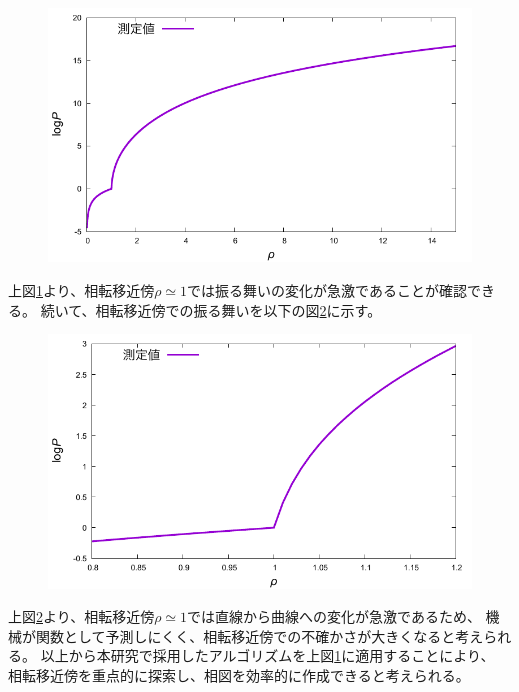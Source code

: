 \documentclass[titlepage]{jsreport}
\begin{document}
{{{\begin{figure}[htbp]
    \begin{center}
        \includegraphics[width=13.5cm]{fig/logarithm_den-pre.pdf}
    \end{center}
    \caption{}
    \label{fig:logarithm_den-pre}
\end{figure}

\newpage
上図\ref{fig:logarithm_den-pre}より、相転移近傍${\rho}\simeq{1}$では振る舞いの変化が急激であることが確認できる。
続いて、相転移近傍での振る舞いを以下の図\ref{fig:middleden-logarithm_den-pre}に示す。

\begin{figure}[htbp]
    \begin{center}
        \includegraphics[width=13.5cm]{fig/middleden-logarithm_den-pre.pdf}
    \end{center}
    \caption{}
    \label{fig:middleden-logarithm_den-pre}
\end{figure}

\newpage
上図\ref{fig:middleden-logarithm_den-pre}より、相転移近傍${\rho}\simeq{1}$では直線から曲線への変化が急激であるため、
機械が関数として予測しにくく、相転移近傍での不確かさが大きくなると考えられる。
以上から本研究で採用したアルゴリズムを上図\ref{fig:logarithm_den-pre}に適用することにより、
相転移近傍を重点的に探索し、相図を効率的に作成できると考えられる。







}}}
\end{document}
